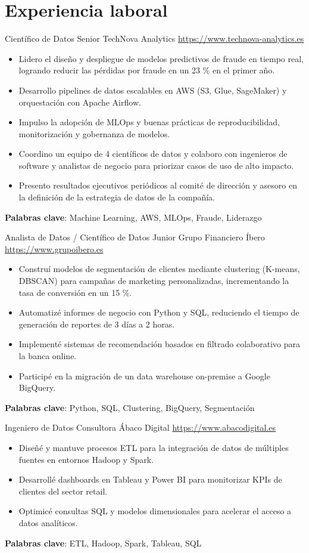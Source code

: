 \documentclass[a4paper, serif, 10pt]{moderncv}
\begin{document}
\section{Experiencia laboral}

        {Científico de Datos Senior}
        {TechNova Analytics}
        {\url{https://www.technova-analytics.es}}
        {}
        {\begin{itemize}
\item Lidero el diseño y despliegue de modelos predictivos de fraude en tiempo real, logrando reducir las pérdidas por fraude en un 23 \% en el primer año.
\item Desarrollo pipelines de datos escalables en AWS (S3, Glue, SageMaker) y orquestación con Apache Airflow.
\item Impulso la adopción de MLOps y buenas prácticas de reproducibilidad, monitorización y gobernanza de modelos.
\item Coordino un equipo de 4 científicos de datos y colaboro con ingenieros de software y analistas de negocio para priorizar casos de uso de alto impacto.
\item Presento resultados ejecutivos periódicos al comité de dirección y asesoro en la definición de la estrategia de datos de la compañía.
\end{itemize}
\textbf{Palabras clave}: Machine Learning, AWS, MLOps, Fraude, Liderazgo}

        {Analista de Datos / Científico de Datos Junior}
        {Grupo Financiero Íbero}
        {\url{https://www.grupoibero.es}}
        {}
        {\begin{itemize}
\item Construí modelos de segmentación de clientes mediante clustering (K-means, DBSCAN) para campañas de marketing personalizadas, incrementando la tasa de conversión en un 15 \%.
\item Automatizé informes de negocio con Python y SQL, reduciendo el tiempo de generación de reportes de 3 días a 2 horas.
\item Implementé sistemas de recomendación basados en filtrado colaborativo para la banca online.
\item Participé en la migración de un data warehouse on-premise a Google BigQuery.
\end{itemize}
\textbf{Palabras clave}: Python, SQL, Clustering, BigQuery, Segmentación}

        {Ingeniero de Datos}
        {Consultora Ábaco Digital}
        {\url{https://www.abacodigital.es}}
        {}
        {\begin{itemize}
\item Diseñé y mantuve procesos ETL para la integración de datos de múltiples fuentes en entornos Hadoop y Spark.
\item Desarrollé dashboards en Tableau y Power BI para monitorizar KPIs de clientes del sector retail.
\item Optimicé consultas SQL y modelos dimensionales para acelerar el acceso a datos analíticos.
\end{itemize}
\textbf{Palabras clave}: ETL, Hadoop, Spark, Tableau, SQL}
\end{document}
